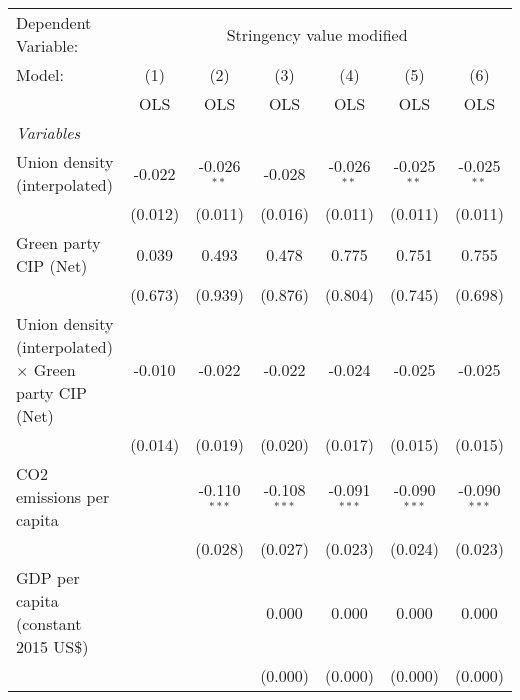 
\begingroup
\centering
\begin{tabular}{lcccccc}
   \toprule
   Dependent Variable: & \multicolumn{6}{c}{Stringency value modified}\\
   Model:                                                       & (1)     & (2)            & (3)            & (4)            & (5)            & (6)\\  
                                                                &  OLS    & OLS            & OLS            & OLS            & OLS            & OLS\\  
   \midrule
   \emph{Variables}\\
   Union density (interpolated)                                 & -0.022  & -0.026$^{**}$  & -0.028         & -0.026$^{**}$  & -0.025$^{**}$  & -0.025$^{**}$\\   
                                                                & (0.012) & (0.011)        & (0.016)        & (0.011)        & (0.011)        & (0.011)\\   
   Green party CIP (Net)                                        & 0.039   & 0.493          & 0.478          & 0.775          & 0.751          & 0.755\\   
                                                                & (0.673) & (0.939)        & (0.876)        & (0.804)        & (0.745)        & (0.698)\\   
   Union density (interpolated) $\times$ Green party CIP (Net)  & -0.010  & -0.022         & -0.022         & -0.024         & -0.025         & -0.025\\   
                                                                & (0.014) & (0.019)        & (0.020)        & (0.017)        & (0.015)        & (0.015)\\   
   CO2 emissions per capita                                     &         & -0.110$^{***}$ & -0.108$^{***}$ & -0.091$^{***}$ & -0.090$^{***}$ & -0.090$^{***}$\\   
                                                                &         & (0.028)        & (0.027)        & (0.023)        & (0.024)        & (0.023)\\   
   GDP per capita (constant 2015 US\$)                          &         &                & 0.000          & 0.000          & 0.000          & 0.000\\   
                                                                &         &                & (0.000)        & (0.000)        & (0.000)        & (0.000)\\   

\end{tabular}
